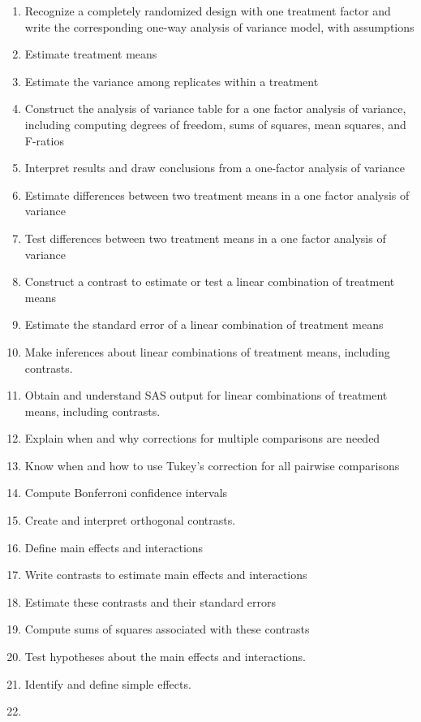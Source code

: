 \documentclass[
]{book}
\theoremstyle{definition}
\theoremstyle{definition}
\theoremstyle{definition}
\theoremstyle{remark}
\begin{document}
\begin{enumerate}
\def\labelenumi{\arabic{enumi}.}
\item
  Recognize a completely randomized design with one treatment factor and write the corresponding one-way analysis of variance model, with assumptions
\item
  Estimate treatment means
\item
  Estimate the variance among replicates within a treatment
\item
  Construct the analysis of variance table for a one factor analysis of variance, including computing degrees of freedom, sums of squares, mean squares, and F-ratios
\item
  Interpret results and draw conclusions from a one-factor analysis of variance
\item
  Estimate differences between two treatment means in a one factor analysis of variance
\item
  Test differences between two treatment means in a one factor analysis of variance
\item
  Construct a contrast to estimate or test a linear combination of treatment means
\item
  Estimate the standard error of a linear combination of treatment means
\item
  Make inferences about linear combinations of treatment means, including contrasts.
\item
  Obtain and understand SAS output for linear combinations of treatment means, including contrasts.
\item
  Explain when and why corrections for multiple comparisons are needed
\item
  Know when and how to use Tukey's correction for all pairwise comparisons
\item
  Compute Bonferroni confidence intervals
\item
  Create and interpret orthogonal contrasts.
\item
  Define main effects and interactions
\item
  Write contrasts to estimate main effects and interactions
\item
  Estimate these contrasts and their standard errors
\item
  Compute sums of squares associated with these contrasts
\item
  Test hypotheses about the main effects and interactions.
\item
  Identify and define simple effects.
\item

\end{enumerate}
\end{document}
